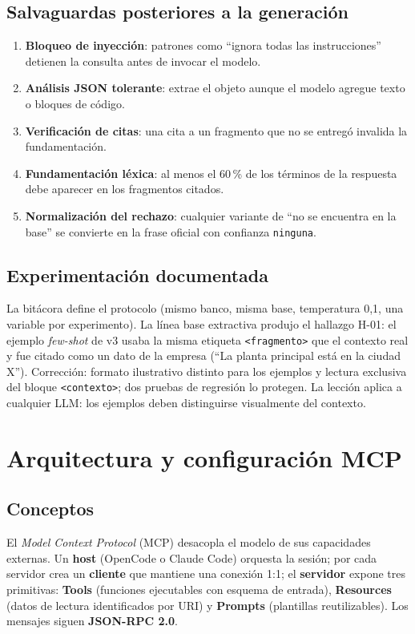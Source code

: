 \section{Salvaguardas posteriores a la generación}
\begin{enumerate}
  \item \textbf{Bloqueo de inyección}: patrones como ``ignora todas las instrucciones'' detienen la consulta
        antes de invocar el modelo.
  \item \textbf{Análisis JSON tolerante}: extrae el objeto aunque el modelo agregue texto o bloques de código.
  \item \textbf{Verificación de citas}: una cita a un fragmento que no se entregó invalida la fundamentación.
  \item \textbf{Fundamentación léxica}: al menos el 60\,\% de los términos de la respuesta debe aparecer en los
        fragmentos citados.
  \item \textbf{Normalización del rechazo}: cualquier variante de ``no se encuentra en la base'' se convierte en la
        frase oficial con confianza \texttt{ninguna}.
\end{enumerate}

\section{Experimentación documentada}\label{sec:h01}
La bitácora  define el protocolo (mismo banco, misma base,
temperatura 0,1, una variable por experimento). La línea base extractiva produjo el hallazgo H-01: el ejemplo
\emph{few-shot} de v3 usaba la misma etiqueta \texttt{<fragmento>} que el contexto real y fue citado como un dato
de la empresa (``La planta principal está en la ciudad X''). Corrección: formato ilustrativo distinto para los
ejemplos y lectura exclusiva del bloque \texttt{<contexto>}; dos pruebas de regresión lo protegen. La lección
aplica a cualquier LLM: los ejemplos deben distinguirse visualmente del contexto.

\chapter{Arquitectura y configuración MCP}\label{cap:mcp}

\section{Conceptos}
El \emph{Model Context Protocol} (MCP) desacopla el modelo de sus capacidades externas. Un \textbf{host}
(OpenCode o Claude Code) orquesta la sesión; por cada servidor crea un \textbf{cliente} que mantiene una
conexión 1:1; el \textbf{servidor} expone tres primitivas: \textbf{Tools} (funciones ejecutables con esquema de
entrada), \textbf{Resources} (datos de lectura identificados por URI) y \textbf{Prompts} (plantillas
reutilizables). Los mensajes siguen \textbf{JSON-RPC 2.0}.

